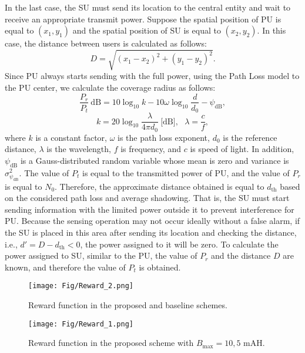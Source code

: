 \documentclass[journal]{IEEEtran}
\begin{document}
		In the last case, the SU must send its location to the central entity and wait to receive an appropriate transmit power. Suppose the spatial position of PU is equal to $(x_1, y_1)$ and the spatial position of SU is equal to $(x_2, y_2)$. In this case, the distance between users is calculated as follows:
		\begin{equation}
			D = \sqrt {{{({x_1} - {x_2})}^2} + {{({y_1} - {y_2})}^2}}.
		\end{equation}
		Since PU always starts sending with the full power, using the Path Loss model to the PU center, we calculate the coverage radius as follows:
		\begin{equation}
			\frac{{{P_r}}}{{{P_t}}}~\text{dB} = 10{\log _{10}}k - 10\omega {\log _{10}}\frac{d}{{{d_0}}} - {\psi _{\text{dB}}},
		\end{equation}
		\begin{equation}
			k = 20{\log _{10}}\frac{\lambda }{{4\pi {d_0}}}~\text{[dB]},~~~\lambda  = \frac{c}{f},
		\end{equation}
		where $k$ is a constant factor, $\omega$ is the path loss exponent, $d_0$ is the reference distance, $\lambda$ is the wavelength, $f$ is frequency, and $c$ is speed of light. In addition, ${\psi _{\text{dB}}}$ is a Gauss-distributed random variable whose mean is zero and variance is $\sigma _{{\psi _{\text{dB}}}}^2$.
		The value of $P_t$ is equal to the transmitted power of PU, and the value of $P_r$ is equal to $N_{0}$. Therefore, the approximate distance obtained is equal to $d_{\text{th}}$ based on the considered path loss and average shadowing. That is, the SU must start sending information with the limited power outside it to prevent interference for PU. Because the sensing operation may not occur ideally without a false alarm, if the SU is placed in this area after sending its location and checking the distance, i.e., $d' = D - {d_{\text{th}}}<0$, the power assigned to it will be zero. To calculate the power assigned to SU, similar to the PU, the value of $P_r$ and the distance $D$ are known, and therefore the value of $P_t$ is obtained.

		\begin{figure}[!t]
			\centering
			\texttt{[image: Fig/Reward\_2.png]}
			\caption{Reward function in the proposed and baseline schemes.}
			\label{Reward2}
		\end{figure}
		\begin{figure}[!t]
			\centering
			\texttt{[image: Fig/Reward\_1.png]}
			\caption{Reward function in the proposed scheme with $B_\text{max}=10,5$ mAH.}
			\label{Reward1}
		\end{figure}
	
\end{document}
